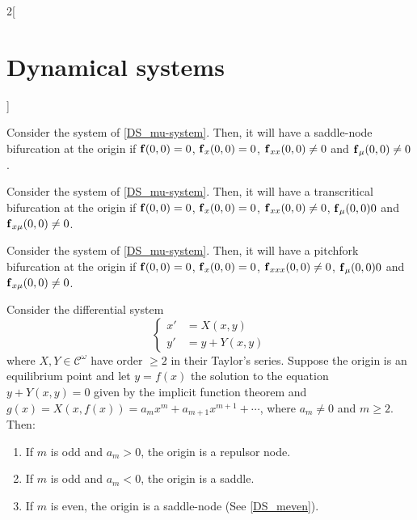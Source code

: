 \documentclass[../../../main_math.tex]{subfiles}
\begin{document}
\begin{multicols}{2}[\section{Dynamical systems}]
\begin{center}
\begin{minipage}{0.32\linewidth}
    \end{minipage}\hfill
    \begin{minipage}{0.32\linewidth}
      \centering
      
    \end{minipage}
    \label{DS_sn-trans-fork--bif}
  \end{center}
  \begin{theorem}
    Consider the system of \cref{DS_mu-system}. Then, it will have a saddle-node bifurcation at the origin if $\boldsymbol{\mathrm{f}}(0,0)=0$, $\boldsymbol{\mathrm{f}}_x(0,0)=0$, $\boldsymbol{\mathrm{f}}_{xx}(0,0)\ne 0$ and $\boldsymbol{\mathrm{f}}_\mu(0,0)\ne0$.
  \end{theorem}
  \begin{theorem}
    Consider the system of \cref{DS_mu-system}. Then, it will have a transcritical bifurcation at the origin if $\boldsymbol{\mathrm{f}}(0,0)=0$, $\boldsymbol{\mathrm{f}}_x(0,0)=0$, $\boldsymbol{\mathrm{f}}_{xx}(0,0)\ne 0$, $\boldsymbol{\mathrm{f}}_\mu(0,0)0$ and $\boldsymbol{\mathrm{f}}_{x\mu}(0,0)\ne 0$.
  \end{theorem}
  \begin{theorem}
    Consider the system of \cref{DS_mu-system}. Then, it will have a pitchfork bifurcation at the origin if $\boldsymbol{\mathrm{f}}(0,0)=0$, $\boldsymbol{\mathrm{f}}_x(0,0)=0$, $\boldsymbol{\mathrm{f}}_{xxx}(0,0)\ne 0$, $\boldsymbol{\mathrm{f}}_\mu(0,0)0$ and $\boldsymbol{\mathrm{f}}_{x\mu}(0,0)\ne 0$.
  \end{theorem}
  \begin{theorem}
    Consider the differential system
    $$
      \left\{
      \begin{aligned}
        {x}' & = X(x,y)    \\
        {y}' & = y+ Y(x,y)
      \end{aligned}
      \right.
    $$
    where $X,Y\in\mathcal{C}^\omega$ have order $\geq 2$ in their Taylor's series. Suppose the origin is an equilibrium point and let $y=f(x)$ the solution to the equation $y+Y(x,y)=0$ given by the implicit function theorem and $g(x)=X(x,f(x))=a_mx^m+a_{m+1}x^{m+1}+\cdots $, where $a_m\ne 0$ and $m\geq 2$. Then:
    \begin{enumerate}
      \item If $m$ is odd and $a_m>0$, the origin is a repulsor node.
      \item If $m$ is odd and $a_m<0$, the origin is a saddle.
      \item If $m$ is even, the origin is a saddle-node (See \cref{DS_meven}).
    \end{enumerate}

\end{theorem}
\end{multicols}
\end{document}
